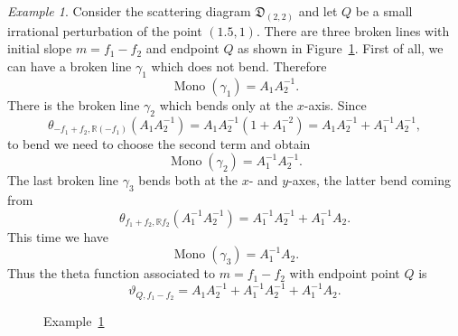 \documentclass[12pt]{amsart}
\theoremstyle{remark}
\newtheorem{example}[theorem]{Example}
\numberwithin{equation}{section}
\newcommand{\RR}{\mathbb{R}}
\newcommand{\DD}{\mathfrak{D}}
\newcommand{\Mono}{\operatorname{Mono}}
\begin{document}
\begin{example} 
  \label{brokenex}
  Consider the scattering diagram $\DD_{(2,2)}$ and let $Q$ be a small
  irrational perturbation of the point $(1.5,1)$. There are three broken lines
  with initial slope $m = f_1-f_2$ and endpoint $Q$ as shown in
  Figure~\ref{figbrokenex}.
  First of all, we can have a broken line $\gamma_1$ which does not bend.
  Therefore
  \[
    \Mono(\gamma_1) = A_1 A_2^{-1}.
  \]
  There is the broken line $\gamma_2$  which bends only at the $x$-axis. Since
  \[ 
    \theta_{-f_1+f_2, \RR(-f_1)} (A_1 A_2^{-1}) = 
    A_1 A_2^{-1}(1+A_1^{-2}) =  A_1 A_2^{-1} + A_1^{-1} A_2^{-1},
  \]
  to bend we need to choose the second term and obtain 
  \[
    \Mono(\gamma_2) =  A_1^{-1} A_2^{-1}.
  \]
  The last broken line $\gamma_3$ bends both at the $x$- and $y$-axes, the
  latter bend coming from
  \[ 
    \theta_{ f_1+f_2, \RR f_2} ( A_1^{-1} A_2^{-1}) =  
    A_1^{-1} A_2^{-1} + A_1^{-1} A_2.  
  \]
  This time we have 
  \[
    \Mono (\gamma_3) = A_1^{-1} A_2.
  \]
  Thus the theta function associated to $m = f_1-f_2$ with endpoint point $Q$ is 
  \[ 
    \vartheta_{Q, f_1-f_2} =  
    A_1 A_2^{-1} + A_1^{-1} A_2^{-1} +A_1^{-1} A_2 .  
  \]
\end{example}

\begin{figure}
  \centering
  \caption{Example~\ref{brokenex}} 
  \label{figbrokenex}
\end{figure}
\end{document}

